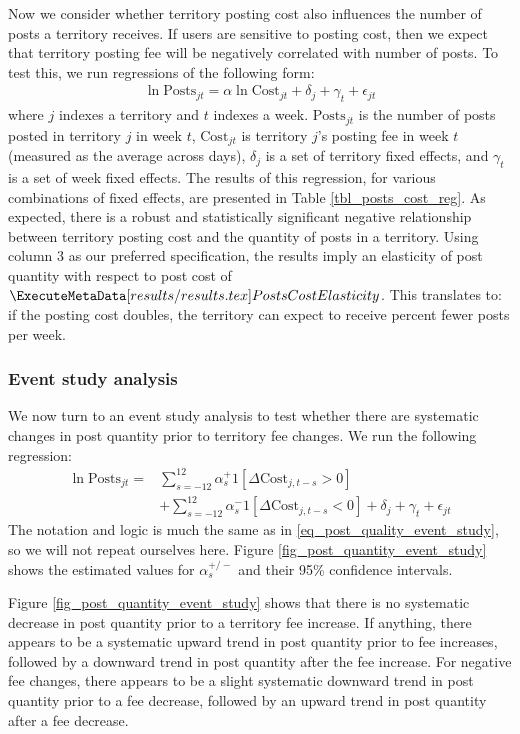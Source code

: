 Now we consider whether territory posting cost also influences the number of posts a territory receives. If users are sensitive to posting cost, then we expect that territory posting fee will be negatively correlated with number of posts. To test this, we run regressions of the following form:
\begin{align}
\ln \text{Posts}_{jt} = \alpha \ln \text{Cost}_{jt} + \delta_{j} + \gamma_{t} + \epsilon_{jt} \label{eq_quant_reg}
\end{align}
where $j$ indexes a territory and $t$ indexes a week. $\text{Posts}_{jt}$ is the number of posts posted in territory $j$ in week $t$, $\text{Cost}_{jt}$ is territory $j$'s posting fee in week $t$ (measured as the average across days), $\delta_j$ is a set of territory fixed effects, and $\gamma_{t}$ is a set of week fixed effects. The results of this regression, for various combinations of fixed effects, are presented in Table \ref{tbl_posts_cost_reg}. As expected, there is a robust and statistically significant negative relationship between territory posting cost and the quantity of posts in a territory. Using column 3 as our preferred specification, the results imply an elasticity of post quantity with respect to post cost of $\gn{PostsCostElasticity}$. This translates to: if the posting cost doubles, the territory can expect to receive  percent fewer posts per week. 

\subsubsection{Event study analysis}

We now turn to an event study analysis to test whether there are systematic changes in post quantity prior to territory fee changes. We run the following regression:
\begin{align}
\ln \text{Posts}_{jt} = & \sum_{s=-12}^{12} \alpha_{s}^{+} 1\left[ \Delta \text{Cost}_{j,t-s}>0 \right] \nonumber \\
& + \sum_{s=-12}^{12} \alpha_{s}^{-} 1\left[ \Delta \text{Cost}_{j,t-s} < 0 \right] + \delta_j + \gamma_t + \epsilon_{jt} \label{eq_post_quantity_event_study}
\end{align}
The notation and logic is much the same as in \eqref{eq_post_quality_event_study}, so we will not repeat ourselves here. Figure \ref{fig_post_quantity_event_study} shows the estimated values for $\alpha_{s}^{+/-}$ and their 95\% confidence intervals. 

Figure \ref{fig_post_quantity_event_study} shows that there is no systematic decrease in post quantity prior to a territory fee increase. If anything, there appears to be a systematic upward trend in post quantity prior to fee increases, followed by a downward trend in post quantity after the fee increase. For negative fee changes, there appears to be a slight systematic downward trend in post quantity prior to a fee decrease, followed by an upward trend in post quantity after a fee decrease.

